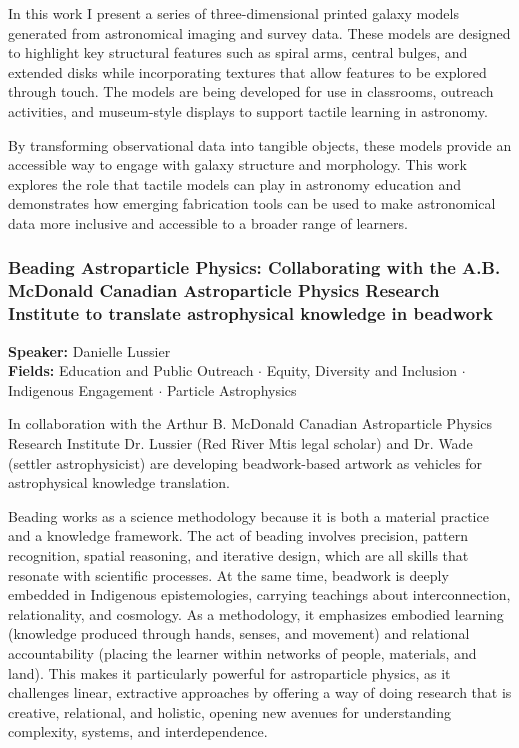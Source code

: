 In this work I present a series of three-dimensional printed galaxy models generated from astronomical imaging and survey data. These models are designed to highlight key structural features such as spiral arms, central bulges, and extended disks while incorporating textures that allow features to be explored through touch. The models are being developed for use in classrooms, outreach activities, and museum-style displays to support tactile learning in astronomy.

By transforming observational data into tangible objects, these models provide an accessible way to engage with galaxy structure and morphology. This work explores the role that tactile models can play in astronomy education and demonstrates how emerging fabrication tools can be used to make astronomical data more inclusive and accessible to a broader range of learners.

\hypertarget{abstract-talk-55}{}\label{abstract-page-talk-55}
\subsubsection*{Beading Astroparticle Physics: Collaborating with the A.B. McDonald Canadian Astroparticle Physics Research Institute to translate astrophysical knowledge in beadwork}
\textbf{Speaker:} Danielle Lussier\\
\textbf{Fields:} Education and Public Outreach $\cdot$ Equity, Diversity and Inclusion $\cdot$ Indigenous Engagement $\cdot$ Particle Astrophysics

In collaboration with the Arthur B. McDonald Canadian Astroparticle Physics Research Institute Dr. Lussier (Red River Mtis legal scholar) and Dr. Wade (settler astrophysicist) are developing beadwork-based artwork as vehicles for astrophysical knowledge translation.

Beading works as a science methodology because it is both a material practice and a knowledge framework. The act of beading involves precision, pattern recognition, spatial reasoning, and iterative design, which are all skills that resonate with scientific processes. At the same time, beadwork is deeply embedded in Indigenous epistemologies, carrying teachings about interconnection, relationality, and cosmology. As a methodology, it emphasizes embodied learning (knowledge produced through hands, senses, and movement) and relational accountability (placing the learner within networks of people, materials, and land). This makes it particularly powerful for astroparticle physics, as it challenges linear, extractive approaches by offering a way of doing research that is creative, relational, and holistic, opening new avenues for understanding complexity, systems, and interdependence.

